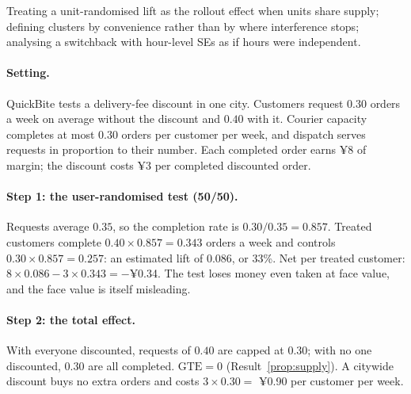 \documentclass[11pt]{article}
\begin{document}
\begin{pitfall}
Treating a unit-randomised lift as the rollout effect when units share supply; defining clusters by convenience
rather than by where interference stops; analysing a switchback with hour-level SEs as if hours were independent.
\end{pitfall}

\sectiontwo

\paragraph{Setting.} QuickBite tests a delivery-fee discount in one city. Customers request $0.30$ orders a week on average
without the discount and $0.40$ with it. Courier capacity completes at most $0.30$ orders per customer per week, and
dispatch serves requests in proportion to their number. Each completed order earns ¥8 of margin; the discount costs
¥3 per completed discounted order.

\paragraph{Step 1: the user-randomised test (50/50).} Requests average $0.35$, so the completion rate is
$0.30/0.35 = 0.857$. Treated customers complete $0.40 \times 0.857 = 0.343$ orders a week and controls
$0.30 \times 0.857 = 0.257$: an estimated lift of $0.086$, or 33\%. Net per treated customer:
$8 \times 0.086 - 3 \times 0.343 = -$¥0.34. The test loses money even taken at face value, and the face value is itself
misleading.

\paragraph{Step 2: the total effect.} With everyone discounted, requests of $0.40$ are capped at $0.30$; with no one
discounted, $0.30$ are all completed. $\text{GTE} = 0$ (Result~\ref{prop:supply}). A citywide discount buys no extra
orders and costs $3 \times 0.30 = $ ¥0.90 per customer per week.
\end{document}
